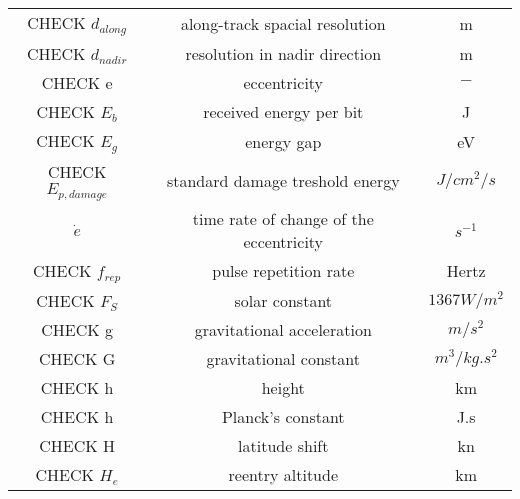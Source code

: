 \begin{center}
\begin{longtable}{c|c|c}
CHECK $d_{along}$                        & along-track spacial resolution                              & m \\

CHECK $d_{nadir}$                             & resolution in nadir direction                 & m \\

CHECK e 																	& eccentricity 																& $-$ \\

CHECK $E_b$                                  & received energy per bit                  & J \\

CHECK $E_g$                                & energy gap                                 & eV \\

CHECK $E_{p,damage}$                        & standard damage treshold energy            & $J/cm^2/s$ \\

$\dot e$ 														& time rate of change of the eccentricity			& $s^{-1}$ \\

CHECK $f_{rep}$                      & pulse repetition rate                   & Hertz \\

CHECK $F_S$                           & solar constant                            & $1367 W/m^2$ \\

CHECK g 																	& gravitational acceleration 									& $m/s^2$ \\

CHECK G                                   & gravitational constant                      & $m^3/{kg.s^2}$ \\

CHECK h                                   & height                                      & km \\

CHECK h                                   & Planck's constant                           & J.s \\

CHECK H                                     & latitude shift                            & kn \\

CHECK $H_e$                                 & reentry altitude     & km \\


\end{longtable}
\end{center}
